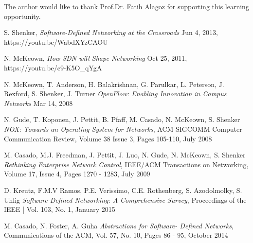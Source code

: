 \documentclass[12pt,journal,compsoc]{IEEEtran}
\begin{document}
The author would like to thank Prof.Dr. Fatih Alagoz for supporting this learning opportunity.


\ifCLASSOPTIONcaptionsoff
  \newpage
\fi


\begin{thebibliography}{1}

 S. Shenker, \emph{Software-Defined Networking at the Crossroads}
Jun 4, 2013, https://youtu.be/WabdXYzCAOU

 N. McKeown, \emph{How SDN will Shape Networking}
Oct 25, 2011, https://youtu.be/c9-K5O\_qYgA

 N. McKeown, T. Anderson, H. Balakrishnan, G. Parulkar, L. Peterson,
J. Rexford, S. Shenker, J. Turner \emph{OpenFlow: Enabling Innovation in Campus Networks}
Mar 14, 2008 

 N. Gude, T. Koponen, J. Pettit, B. Pfaff, M. Casado, N. McKeown, S. Shenker 
 \emph{NOX: Towards an Operating System for Networks}, ACM SIGCOMM Computer Communication Review,
 Volume 38 Issue 3, Pages 105-110, July 2008

 M. Casado, M.J. Freedman, J. Pettit, J. Luo, N. Gude, N. McKeown, S. Shenker 
\emph{Rethinking Enterprise Network Control}, IEEE/ACM Transactions on Networking, Volume 17,  Issue 4,
Pages 1270 - 1283, July 2009

 D. Kreutz, F.M.V Ramos, P.E. Verissimo, C.E. Rothenberg, S. Azodolmolky, S. Uhlig
\emph{Software-Defined Networking: A Comprehensive Survey}, Proceedings of the IEEE | Vol. 103, No. 1, January 2015

 M. Casado, N. Foster, A. Guha
\emph{Abstractions for Software- Defined Networks}, Communications of the ACM, Vol. 57, No. 10,
Pages 86 - 95, October 2014 





\end{thebibliography}
\end{document}
